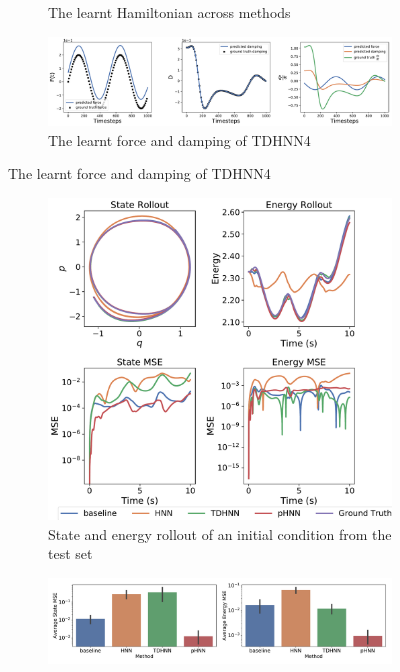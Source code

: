 \documentclass[twoside]{article}
\begin{document}
\begin{figure}[!htb]
\begin{subfigure}[b]{0.48\textwidth}
\caption{The learnt Hamiltonian across methods}
\end{subfigure}
\begin{subfigure}[b]{0.48\textwidth}
\includegraphics[width=\textwidth]{figures/figures/duffing/1/duffing_dpdt_0.pdf}
\caption{The learnt force and damping of TDHNN4}
\end{subfigure}
\label{duffing_1_full}
\end{figure}
\begin{figure}[!htb]
\centering
\captionsetup{justification=centering}
\begin{subfigure}[b]{0.48\textwidth}
\includegraphics[width=\textwidth]{figures/figures/relativity/1/relativity_long_0.pdf}
\caption{State and energy rollout of an initial condition from the test set}
\end{subfigure}
\begin{subfigure}[b]{0.48\textwidth}
\includegraphics[width=\textwidth]{figures/figures/relativity/1/relativity_errors_0.pdf}

\end{subfigure}
\end{figure}
\end{document}
